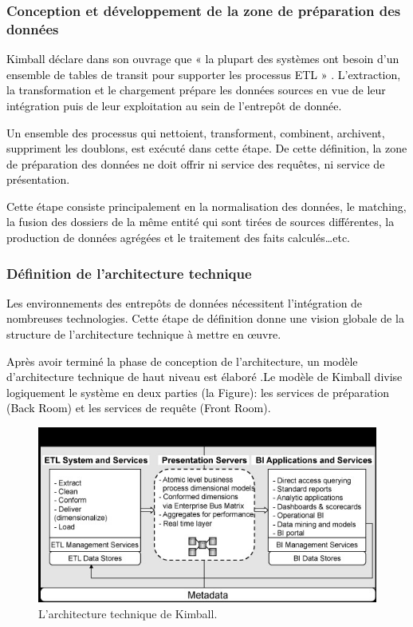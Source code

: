 \documentclass[a4paper,12pt]{report}
\begin{document}
\subsubsection{Conception et développement de la zone de préparation des données}

\textcolor{black}{Kimball déclare dans son ouvrage que « la plupart des systèmes ont besoin d'un ensemble de tables de transit pour supporter les processus ETL » \citep{kimball12data}. L’extraction, la transformation et le chargement  prépare les données sources en vue de leur intégration puis de leur exploitation au sein de l’entrepôt de donnée.}

\textcolor{black}{ Un ensemble des processus qui nettoient, transforment, combinent, archivent, suppriment les doublons, est exécuté dans cette étape. De cette définition, la zone de préparation des données ne doit offrir ni service des requêtes, ni service de présentation. }

\textcolor{black}{Cette étape \citep{kimball2008data} consiste principalement en  la normalisation des données, le matching, la fusion des dossiers de la même entité qui sont tirées de sources différentes,  la production de données agrégées et le traitement des faits calculés…etc.}

\subsubsection{Définition de l’architecture technique}

\textcolor{black}{Les environnements des entrepôts de données nécessitent l’intégration de nombreuses technologies. Cette étape de définition donne une vision globale de la structure de l’architecture technique à mettre en œuvre. }

\textcolor{black}{Après avoir terminé la phase de conception de l'architecture, un modèle d'architecture technique de haut niveau est élaboré \citep{kimball2008data}.Le modèle de Kimball divise logiquement le système en deux parties (la Figure): les services de préparation (Back Room) et les services de requête (Front Room). }

 \begin{figure}[H]
 \begin{center}
 \includegraphics[width=0.9\linewidth]{./images/18}
 \end{center}
 
 \caption{L'architecture technique de Kimball.\citep{kimball16architec}
 }
 \label{fig:18}
 
 \end{figure}
 
\end{document}
